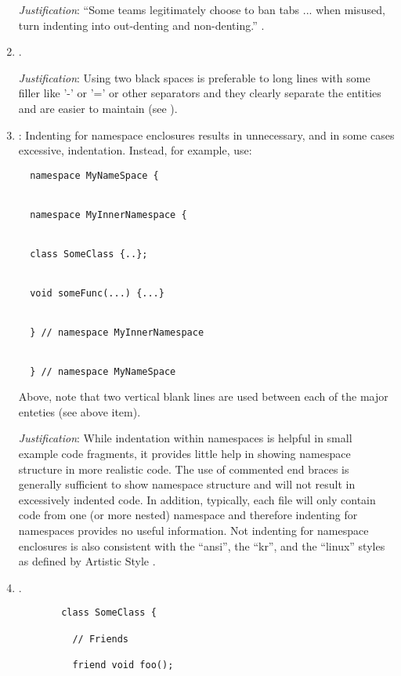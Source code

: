 \begin{enumerate}
{}\textit{Justification}: ``Some teams legitimately choose to ban tabs
... when misused, turn indenting into out-denting and non-denting.''
{}\cite[Item 0]{C++CodingStandards05}.

{}\item\FSCTwoVertialSpaces.

{}\textit{Justification}: Using two black spaces is preferable to long lines
with some filler like '-' or '=' or other separators and they clearly separate
the entities and are easier to maintain (see {}\cite[Section
31.8]{CodeComplete2nd04}).

{}\item\FSCNoNamespaceIndent: Indenting for namespace enclosures results in
unnecessary, and in some cases excessive, indentation.  Instead, for example,
use:

{\small\begin{verbatim}
  namespace MyNameSpace {


  namespace MyInnerNamespace {


  class SomeClass {..};


  void someFunc(...) {...}


  } // namespace MyInnerNamespace


  } // namespace MyNameSpace
\end{verbatim}}

Above, note that two vertical blank lines are used between each of the major
enteties (see above item).

{}\textit{Justification}: While indentation within namespaces is helpful in
small example code fragments, it provides little help in showing namespace
structure in more realistic code.  The use of commented end braces is
generally sufficient to show namespace structure and will not result in
excessively indented code.  In addition, typically, each file will only
contain code from one (or more nested) namespace and therefore indenting for
namespaces provides no useful information.  Not indenting for namespace
enclosures is also consistent with the ``ansi'', the ``kr'', and the ``linux''
styles as defined by Artistic Style {}\cite{ArtisticStyle}.

{}\item\FSCClassDeclarationLayout.

\begin{figure}
%
{\small\begin{verbatim}
  class SomeClass {

    // Friends

    friend void foo();


\end{verbatim}}
\end{figure}
\end{enumerate}

